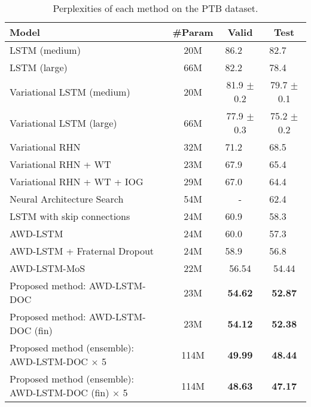 \documentclass[11pt,a4paper]{article}
\begin{document}
\begin{table*}[!t]
  \centering
  \small
  \begin{tabular}{| l  | c | c c |} \hline
  Model & \#Param & Valid & Test \\ \hline
  LSTM (medium) \cite{DBLP:journals/corr/ZarembaSV14} & 20M & 86.2  \ \  & 82.7  \ \  \\
  LSTM (large) \cite{DBLP:journals/corr/ZarembaSV14} & 66M & 82.2  \ \  & 78.4  \ \  \\
  Variational LSTM (medium) \cite{Gal2016Theoretically} & 20M & 81.9 $\pm$ 0.2 & 79.7 $\pm$ 0.1 \\
  Variational LSTM (large) \cite{Gal2016Theoretically} & 66M & 77.9 $\pm$ 0.3 & 75.2 $\pm$ 0.2 \\
  Variational RHN \cite{zilly2016recurrent} & 32M & 71.2  \ \  & 68.5  \ \  \\
  Variational RHN + WT \cite{zilly2016recurrent} & 23M & 67.9  \ \  & 65.4  \ \ \\
  Variational RHN + WT + IOG \cite{takase-suzuki-nagata:2017:I17-2} & 29M & 67.0  \ \  & 64.4 \ \  \\
  Neural Architecture Search \cite{45826} & 54M & - & 62.4 \ \  \\
  LSTM with skip connections \cite{DBLP:journals/corr/MelisDB17} & 24M & 60.9  \ \  & 58.3 \ \  \\
  AWD-LSTM \cite{merityRegOpt} & 24M & 60.0  \ \  & 57.3 \ \  \\
  AWD-LSTM + Fraternal Dropout \cite{fraternal} & 24M & 58.9  \ \  & 56.8 \ \  \\
  AWD-LSTM-MoS \cite{DBLP:journals/corr/abs-1711-03953} & 22M & 56.54 & 54.44 \\ \hline
  Proposed method: AWD-LSTM-DOC & 23M & {\bf 54.62} & {\bf 52.87} \\
  Proposed method: AWD-LSTM-DOC (fin) & 23M & {\bf 54.12} & {\bf 52.38} \\
  Proposed method (ensemble): AWD-LSTM-DOC $\times$ 5 & 114M & {\bf 49.99} & {\bf 48.44} \\
  Proposed method (ensemble): AWD-LSTM-DOC (fin) $\times$ 5 & 114M & {\bf 48.63} & {\bf 47.17} \\ \hline
  \end{tabular}
  \caption{Perplexities of each method on the PTB dataset.\label{tb:perplexity}}
\end{table*}
\end{document}
